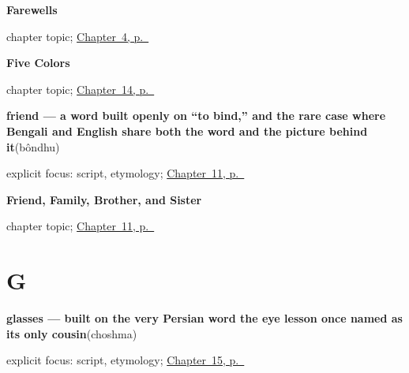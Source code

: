 \noindent\begin{minipage}[t]{\linewidth}
\raggedright
\textbf{Farewells}\par
\footnotesize chapter topic; \hyperref[ch:farewells]{Chapter~4, p.~\pageref*{ch:farewells}}
\end{minipage}\par\smallskip

\noindent\begin{minipage}[t]{\linewidth}
\raggedright
\textbf{Five Colors}\par
\footnotesize chapter topic; \hyperref[ch:bn-five-colors]{Chapter~14, p.~\pageref*{ch:bn-five-colors}}
\end{minipage}\par\smallskip

\noindent\begin{minipage}[t]{\linewidth}
\raggedright
\textbf{friend — a word built openly on \textquotedblleft{}to bind,\textquotedblright{} and the rare case where Bengali and English share both the word and the picture behind it}\enspace\emph{}\enspace(bôndhu)\par
\footnotesize explicit focus: script, etymology; \hyperref[ch:bn-friend-family-brother-sister]{Chapter~11, p.~\pageref*{ch:bn-friend-family-brother-sister}}
\end{minipage}\par\smallskip

\noindent\begin{minipage}[t]{\linewidth}
\raggedright
\textbf{Friend, Family, Brother, and Sister}\par
\footnotesize chapter topic; \hyperref[ch:bn-friend-family-brother-sister]{Chapter~11, p.~\pageref*{ch:bn-friend-family-brother-sister}}
\end{minipage}\par\smallskip

\section*{G}

\noindent\begin{minipage}[t]{\linewidth}
\raggedright
\textbf{glasses — built on the very Persian word the eye lesson once named as its only cousin}\enspace\emph{}\enspace(choshma)\par
\footnotesize explicit focus: script, etymology; \hyperref[ch:bn-cloth-shirt-sari-glasses]{Chapter~15, p.~\pageref*{ch:bn-cloth-shirt-sari-glasses}}
\end{minipage}\par\smallskip

